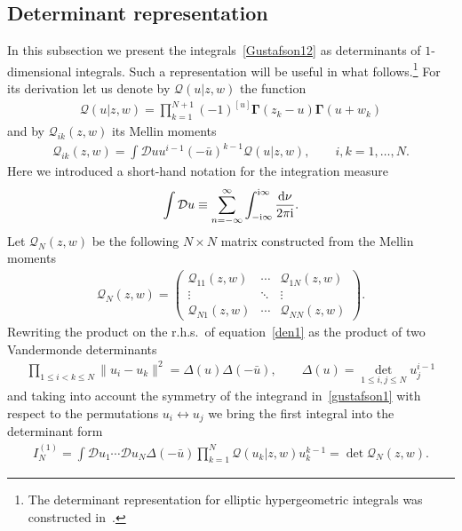 \subsection{Determinant representation}\label{subsec:det}

In this subsection we present the integrals~\eqref{Gustafson12} as determinants of $1$-dimensional integrals. Such a representation will be useful in what follows.\footnote{The determinant representation for elliptic hypergeometric integrals was constructed in~\cite{RainSpiridonov}.} For its derivation let us denote by $\mathcal Q (u|z,w)$ the function
\begin{gather*}%
\mathcal Q (u|z,w)={\prod_{k=1}^{N+1}(-1)^{[u]}\boldsymbol\Gamma(z_k-u)\boldsymbol\Gamma(u+w_k)}
\end{gather*}
and by ${\mathcal{Q}}_{ik}(z,w)$ its Mellin moments
\begin{gather}\label{MellinQ}
{\mathcal{Q}}_{ik}(z,w)=\int \mathcal Du u^{i-1} (-\bar u)^{k-1} \mathcal Q (u|z,w), \qquad i,k=1,\ldots,N.
\end{gather}
Here we introduced a short-hand notation for the integration measure
\begin{gather*}
\int\mathcal Du\equiv
\sum_{n=-\infty}^{\infty}\int_{-{\rm i}\infty}^{{\rm i}\infty}\frac{{\rm d}\nu}{2\pi {\rm i}} .
\end{gather*}
Let $\boldsymbol{\mathcal Q}_N(z,w)$ be the following $N\times N$ matrix constructed from the Mellin moments
 \begin{gather}\label{Q-matrix}
\boldsymbol{\mathcal Q}_N(z,w)=\begin{pmatrix}
{\mathcal{Q}}_{11}(z,w)&\cdots& {\mathcal{Q}}_{1N}(z,w)
\\
\vdots & \ddots &\vdots
\\
{\mathcal{Q}}_{N1}(z,w)&\cdots& {\mathcal{Q}}_{NN}(z,w)
\end{pmatrix}.
\end{gather}
Rewriting the product on the r.h.s.\ of equation~\eqref{den1} as the product of two Vandermonde determinants
\begin{gather*}
\prod_{1\leq i<k\leq N}\|u_i-u_k\|^2=\Delta(u) \Delta (-\bar u), \qquad \Delta(u)=\det_{1\leq i,j\leq N} u_j^{i-1}
\end{gather*}
and taking into account the symmetry of the integrand in~\eqref{gustafson1} with respect to the permutations $u_i\leftrightarrow u_j$ we bring the first integral into the determinant form
\begin{gather}\label{det-rep-1}
I_N^{(1)} =\int\mathcal Du_1\cdots \mathcal Du_N \Delta(-\bar u) \prod_{k=1}^N \mathcal Q (u_k|z,w) u_k^{k-1}=\det \boldsymbol{\mathcal Q}_N(z,w).
\end{gather}
